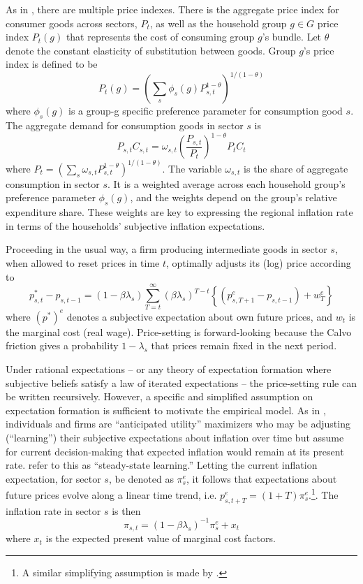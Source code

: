 \documentclass[12pt]{article}
\begin{document}
As in \cite{Cravinoetal:JME2020}, there are multiple price indexes. There is the aggregate price index for consumer goods across sectors, $P_t$, as well as the household group $g\in G$ price index $P_t(g)$ that represents the cost of consuming group $g$'s bundle. Let $\theta$ denote the constant elasticity of substitution between goods. Group $g$'s price index is defined to be
$$ P_t(g) = \left( \sum_s \phi_s(g)P^{1-\theta}_{s,t}\right)^{1/(1-\theta)}$$
where $\phi_s(g)$ is a group-g specific preference parameter for consumption good $s$. The aggregate demand for consumption goods in sector $s$ is
$$ P_{s,t}C_{s,t} = \omega_{s,t}\left(\frac{P_{s,t}}{P_t}\right)^{1-\theta} P_tC_t$$
where $P_t=\left(\sum_s\omega_{s,t}P_{s,t}^{1-\theta}\right)^{1/(1-\theta)}$. The variable $\omega_{s,t}$ is the share of aggregate consumption in sector $s$. It is a weighted average across each household group's preference parameter $\phi_s(g)$, and the weights depend on the group's relative expenditure share. These weights are key to expressing the regional inflation rate in terms of the households' subjective inflation expectations.

Proceeding in the usual way, a firm producing intermediate goods in sector $s$, when allowed to reset prices in time $t$, optimally adjusts its (log) price according to
$$p^*_{s,t} - p_{s,t-1}= \left( 1-\beta\lambda_s\right)\sum_{T=t}^{\infty}\left(\beta\lambda_s\right)^{T-t}\left\{ \left(p^e_{s,T+1}-p_{s,t-1}\right) + w^e_{T}\right\}$$
where $(p^*)^e$ denotes a subjective expectation about own future prices, and $w_t$ is the marginal cost (real wage). Price-setting is forward-looking because the Calvo friction gives a probability $1-\lambda_s$ that prices remain fixed in the next period.  

Under rational expectations -- or any theory of expectation formation where subjective beliefs satisfy a law of iterated expectations -- the price-setting rule can be written recursively. However, a specific and simplified assumption on expectation formation is sufficient to motivate the empirical model. As in \cite{Woodford:annualreview}, individuals and firms are ``anticipated utility'' maximizers who may be adjusting (``learning'') their subjective expectations about inflation over time but assume for current decision-making that expected inflation would remain at its present rate. \cite{EvansHonkap-book} refer to this as ``steady-state learning.'' Letting the current inflation expectation, for sector $s$, be denoted as $\pi^e_s$, it follows that expectations about future prices evolve along a linear time trend, i.e. $p^e_{s,t+T} = (1+T)\pi^e_s$.\footnote{A similar simplifying assumption is made by \cite{Werning:expectsWP}.}. The inflation rate in sector $s$ is then
\begin{equation}\label{secPC}
 \pi_{s,t} = \left(1-\beta\lambda_s\right)^{-1} \pi^e_{s} + x_t
 \end{equation}
where $x_t$ is the expected present value of marginal cost factors.
\end{document}
